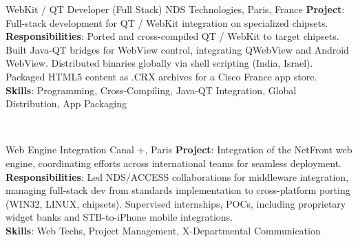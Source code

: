 \documentclass[
  a4paper,
   maincolor=cvblue,
   sectioncolor=cvblue,
]{fortysecondscv}
\begin{document}
\begin{cvtable}
    {WebKit / QT Developer (Full Stack)}
    {NDS Technologies, Paris, France}
    {
      \textbf{Project}: Full-stack development for QT / WebKit integration on specialized chipsets.\\
      \textbf{Responsibilities}:
          Ported and cross-compiled QT / WebKit to target chipsets. Built Java-QT bridges for WebView control, integrating QWebView and Android WebView. Distributed binaries globally via shell scripting (India, Israel). Packaged HTML5 content as .CRX archives for a Cisco France app store.\\
      \textbf{Skills}: Programming, Cross-Compiling, Java-QT Integration, Global Distribution, App Packaging\\
    }
\end{cvtable}
\\
\begin{cvtable}
    {Web Engine Integration}
    {Canal +, Paris}
    {
      \textbf{Project}: Integration of the NetFront web engine, coordinating efforts across international teams for seamless deployment.\\
      \textbf{Responsibilities}:
          Led NDS/ACCESS collaborations for middleware integration, managing full-stack dev from standards implementation to cross-platform porting (WIN32, LINUX, chipsets).
          Supervised internships, POCs, including proprietary widget banks and STB-to-iPhone mobile integrations.\\
      \textbf{Skills}: Web Techs, Project Management, X-Departmental Communication\\
    }
\end{cvtable}
\end{document}
